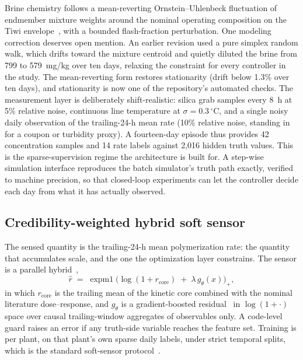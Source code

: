 \documentclass[review,number,sort&compress]{elsarticle}
\begin{document}
Brine chemistry follows a mean-reverting Ornstein--Uhlenbeck
fluctuation of endmember mixture weights around the nominal operating
composition on the Tiwi envelope~\citep{sugiaman2004geochemical}, with
a bounded flash-fraction perturbation. One modeling correction deserves
open mention. An earlier revision used a pure simplex random walk,
which drifts toward the mixture centroid and quietly diluted the brine
from 799 to 579~mg/kg over ten days, relaxing the constraint for every
controller in the study. The mean-reverting form restores stationarity
(drift below 1.3\% over ten days), and stationarity is now one of the
repository's automated checks. The measurement layer is deliberately
shift-realistic: silica grab samples every 8~h at 5\% relative noise,
continuous line temperature at $\sigma = 0.3\,^{\circ}$C, and a single
noisy daily observation of the trailing-24-h mean rate (10\% relative
noise, standing in for a coupon or turbidity proxy). A fourteen-day
episode thus provides 42 concentration samples and 14 rate labels
against 2{,}016 hidden truth values. This is the sparse-supervision
regime the architecture is built for. A step-wise simulation interface
reproduces the batch simulator's truth path exactly, verified to
machine precision, so that closed-loop experiments can let the
controller decide each day from what it has actually observed.

\subsection{Credibility-weighted hybrid soft sensor}\label{sec:sensor}

The sensed quantity is the trailing-24-h mean polymerization rate: the
quantity that accumulates scale, and the one the optimization layer
constrains. The sensor is a parallel
hybrid~\citep{thompson1994modeling,vonstosch2014hybrid},
\begin{equation}\label{eq:sensor}
\hat r \;=\; \operatorname{expm1}\!\big(\log(1{+}r_{\mathrm{core}})
\;+\; \lambda\, g_{\theta}(x)\big)_{+},
\end{equation}
in which $r_{\mathrm{core}}$ is the trailing mean of the kinetic core
combined with the nominal literature dose--response, and $g_{\theta}$
is a gradient-boosted residual~\citep{ke2017lightgbm} in
$\log(1{+}\cdot)$ space over causal trailing-window aggregates of
observables only. A code-level guard raises an error if any truth-side
variable reaches the feature set. Training is per plant, on that
plant's own sparse daily labels, under strict temporal splits, which is
the standard soft-sensor protocol~\citep{kadlec2009data}.
\end{document}
